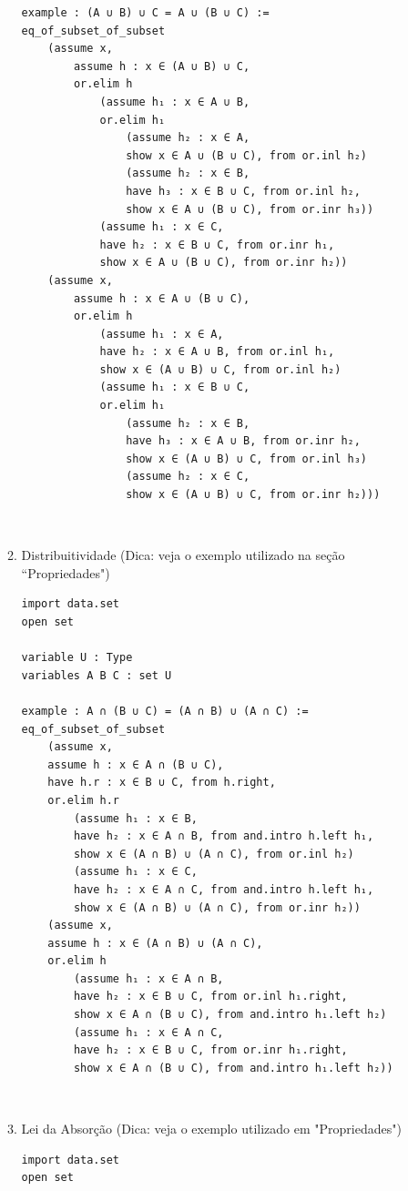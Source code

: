 \begin{enumerate}
\begin{enumerate}
\begin{lstlisting}
example : (A ∪ B) ∪ C = A ∪ (B ∪ C) :=
eq_of_subset_of_subset
    (assume x,
        assume h : x ∈ (A ∪ B) ∪ C,
        or.elim h
            (assume h₁ : x ∈ A ∪ B,
            or.elim h₁
                (assume h₂ : x ∈ A,
                show x ∈ A ∪ (B ∪ C), from or.inl h₂)
                (assume h₂ : x ∈ B,
                have h₃ : x ∈ B ∪ C, from or.inl h₂,
                show x ∈ A ∪ (B ∪ C), from or.inr h₃))
            (assume h₁ : x ∈ C,
            have h₂ : x ∈ B ∪ C, from or.inr h₁,
            show x ∈ A ∪ (B ∪ C), from or.inr h₂))
    (assume x,
        assume h : x ∈ A ∪ (B ∪ C),
        or.elim h
            (assume h₁ : x ∈ A,
            have h₂ : x ∈ A ∪ B, from or.inl h₁,
            show x ∈ (A ∪ B) ∪ C, from or.inl h₂)
            (assume h₁ : x ∈ B ∪ C,
            or.elim h₁
                (assume h₂ : x ∈ B,
                have h₃ : x ∈ A ∪ B, from or.inr h₂,
                show x ∈ (A ∪ B) ∪ C, from or.inl h₃)
                (assume h₂ : x ∈ C,
                show x ∈ (A ∪ B) ∪ C, from or.inr h₂))) \end{lstlisting}

$\qquad$
\item Distribuitividade (Dica: veja o exemplo utilizado na seção ``Propriedades")
\begin{lstlisting}
import data.set
open set

variable U : Type
variables A B C : set U

example : A ∩ (B ∪ C) = (A ∩ B) ∪ (A ∩ C) :=
eq_of_subset_of_subset
    (assume x,
    assume h : x ∈ A ∩ (B ∪ C),
    have h.r : x ∈ B ∪ C, from h.right,
    or.elim h.r
        (assume h₁ : x ∈ B,
        have h₂ : x ∈ A ∩ B, from and.intro h.left h₁,
        show x ∈ (A ∩ B) ∪ (A ∩ C), from or.inl h₂)
        (assume h₁ : x ∈ C,
        have h₂ : x ∈ A ∩ C, from and.intro h.left h₁,
        show x ∈ (A ∩ B) ∪ (A ∩ C), from or.inr h₂))
    (assume x,
    assume h : x ∈ (A ∩ B) ∪ (A ∩ C),
    or.elim h
        (assume h₁ : x ∈ A ∩ B,
        have h₂ : x ∈ B ∪ C, from or.inl h₁.right,
        show x ∈ A ∩ (B ∪ C), from and.intro h₁.left h₂)
        (assume h₁ : x ∈ A ∩ C,
        have h₂ : x ∈ B ∪ C, from or.inr h₁.right,
        show x ∈ A ∩ (B ∪ C), from and.intro h₁.left h₂)) \end{lstlisting}

$\qquad$
\item Lei da Absorção (Dica: veja o exemplo utilizado em "Propriedades")
\begin{lstlisting}
import data.set
open set


\end{lstlisting}
\end{enumerate}
\end{enumerate}
